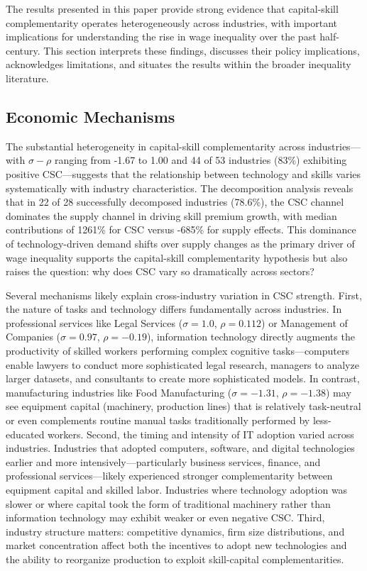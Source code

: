 \documentclass[12pt]{article}
\begin{document}
The results presented in this paper provide strong evidence that capital-skill complementarity operates heterogeneously across industries, with important implications for understanding the rise in wage inequality over the past half-century. This section interprets these findings, discusses their policy implications, acknowledges limitations, and situates the results within the broader inequality literature.

\subsection{Economic Mechanisms}\label{sec:mechanisms}

The substantial heterogeneity in capital-skill complementarity across industries---with $\sigma - \rho$ ranging from -1.67 to 1.00 and 44 of 53 industries (83\%) exhibiting positive CSC---suggests that the relationship between technology and skills varies systematically with industry characteristics. The decomposition analysis reveals that in 22 of 28 successfully decomposed industries (78.6\%), the CSC channel dominates the supply channel in driving skill premium growth, with median contributions of 1261\% for CSC versus -685\% for supply effects. This dominance of technology-driven demand shifts over supply changes as the primary driver of wage inequality supports the capital-skill complementarity hypothesis but also raises the question: why does CSC vary so dramatically across sectors?

Several mechanisms likely explain cross-industry variation in CSC strength. First, the nature of tasks and technology differs fundamentally across industries. In professional services like Legal Services ($\sigma = 1.0$, $\rho = 0.112$) or Management of Companies ($\sigma = 0.97$, $\rho = -0.19$), information technology directly augments the productivity of skilled workers performing complex cognitive tasks---computers enable lawyers to conduct more sophisticated legal research, managers to analyze larger datasets, and consultants to create more sophisticated models. In contrast, manufacturing industries like Food Manufacturing ($\sigma = -1.31$, $\rho = -1.38$) may see equipment capital (machinery, production lines) that is relatively task-neutral or even complements routine manual tasks traditionally performed by less-educated workers. Second, the timing and intensity of IT adoption varied across industries. Industries that adopted computers, software, and digital technologies earlier and more intensively---particularly business services, finance, and professional services---likely experienced stronger complementarity between equipment capital and skilled labor. Industries where technology adoption was slower or where capital took the form of traditional machinery rather than information technology may exhibit weaker or even negative CSC. Third, industry structure matters: competitive dynamics, firm size distributions, and market concentration affect both the incentives to adopt new technologies and the ability to reorganize production to exploit skill-capital complementarities.
\end{document}
